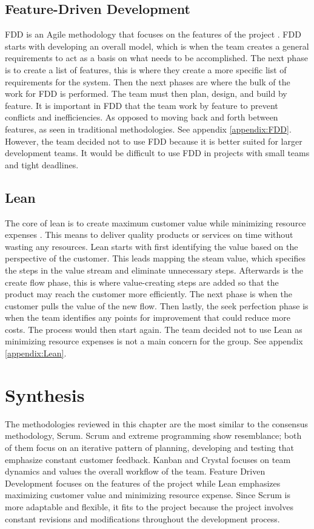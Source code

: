 \subsection{Feature-Driven Development}
FDD is an Agile methodology that focuses on the features of the project \cite{ref:FDD}. FDD starts with developing an overall model, which is when the team creates a general requirements to act as a basis on what needs to be accomplished. The next phase is to create a list of features, this is where they create a more specific list of requirements for the system. Then the next phases are where the bulk of the work for FDD is performed. The team must then plan, design, and build by feature. It is important in FDD that the team work by feature to prevent conflicts and inefficiencies. As opposed to moving back and forth between features, as seen in traditional methodologies. See appendix \ref{appendix:FDD}. However, the team decided not to use FDD because it is better suited for larger development teams. It would be difficult to use FDD in projects with small teams and tight deadlines. \cite{ref:FDDDisadvantage}

\subsection{Lean}
The core of lean is to create maximum customer value while minimizing resource expenses \cite{ref:Lean}.  This means to deliver quality products or services on time without wasting any resources. Lean starts with first identifying the value based on the perspective of the customer. This leads mapping the steam value, which specifies the steps in the value stream and eliminate unnecessary steps. Afterwards is the create flow phase, this is where value-creating steps are added so that the product may reach the customer more efficiently. The next phase is when the customer pulls the value of the new flow. Then lastly, the seek perfection phase is when the team identifies any points for improvement that could reduce more costs. The process would then start again. The team decided not to use Lean as minimizing resource expenses is not a main concern for the group. See appendix \ref{appendix:Lean}. 

\section{Synthesis}
The methodologies reviewed in this chapter are the most similar to the consensus methodology, Scrum. Scrum and extreme programming show resemblance; both of them focus on an iterative pattern of planning, developing and testing that emphasize constant customer feedback. Kanban and Crystal  focuses on team dynamics and values the overall workflow of the team. Feature Driven Development focuses on the features of the project while Lean emphasizes maximizing customer value and minimizing resource expense. Since Scrum is more adaptable and flexible, it fits to the project because the project involves constant revisions and modifications throughout the development process. 